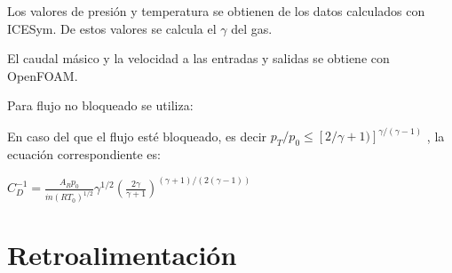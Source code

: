 Los valores de presión y temperatura se obtienen de los datos calculados con
ICESym. De estos valores se calcula el $\gamma$ del gas.

El caudal másico y la velocidad a las entradas y salidas se obtiene con
OpenFOAM.

Para flujo no bloqueado se utiliza:

En caso del que el flujo esté bloqueado, es decir
$p_T/p_0 \le [2/\gamma+1)]^{\gamma/(\gamma - 1)}$
, la ecuación correspondiente es:

\begin{math}
C_D^{-1} =  \frac {A_R p_0} {\dot{m} (R T_0)^{1/2}}
            \gamma^{1/2}
            \left( \frac{2\gamma}{\gamma+1} \right)^{(\gamma+1)/(2(\gamma-1))}
\end{math}

\section{Retroalimentación}

